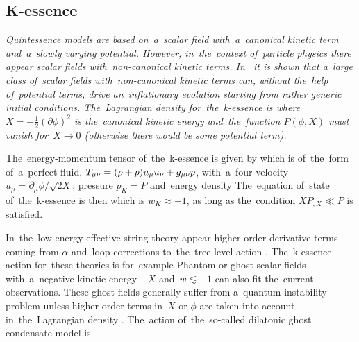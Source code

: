\subsection{K-essence}
{\itshape
Quintessence models are based on~a~scalar field with~a~canonical kinetic term and~a~slowly varying potential. However, in~the~context of~particle physics there appear scalar fields with~non-canonical kinetic terms. In~\textcite{1999PhLB..458..209A} it is shown that a~large class of~scalar fields with~non-canonical kinetic terms can, without the~help of~potential terms, drive an~inflationary evolution starting from rather generic initial conditions. The~Lagrangian density for~the~k-essence is
where $X=-\frac12(\partial\phi)^2$ is the~canonical kinetic energy and~the~function $P(\phi, X)$ must vanish for~$X\rightarrow0$ (otherwise there would be some potential term). 

The~energy-momentum tensor of~the~k-essence is given by
which is of~the~form of~a~perfect fluid, $T_{\mu\nu}=(\rho+p)u_\mu u_\nu+g_{\mu\nu} p$, with~a~four-velocity $u_\mu=\partial_\mu\phi/\sqrt{2X}$, pressure $p_K=P$ and~energy density
The~equation of~state of~the~k-essence is then
which is $w_K\approx-1$, as long as the~condition $XP_{,X}\ll P$ is satisfied.

In~the~low-energy effective string theory appear higher-order derivative terms coming from $\alpha$ and~loop corrections to~the~tree-level action \parencite{2003PhR...373....1G}. The~k-essence action for~these theories is for~example
Phantom or ghost scalar fields with~a~negative kinetic energy $-X$ and~$w\lesssim-1$ can also fit the~current observations. These ghost fields generally suffer from a~quantum instability problem unless higher-order terms in~$X$ or $\phi$ are taken into account in~the~Lagrangian density \parencite{2010deto.book.....A}. The~action of~the~so-called dilatonic ghost condensate model is \parencite{2004JCAP...07..004P}
} 
